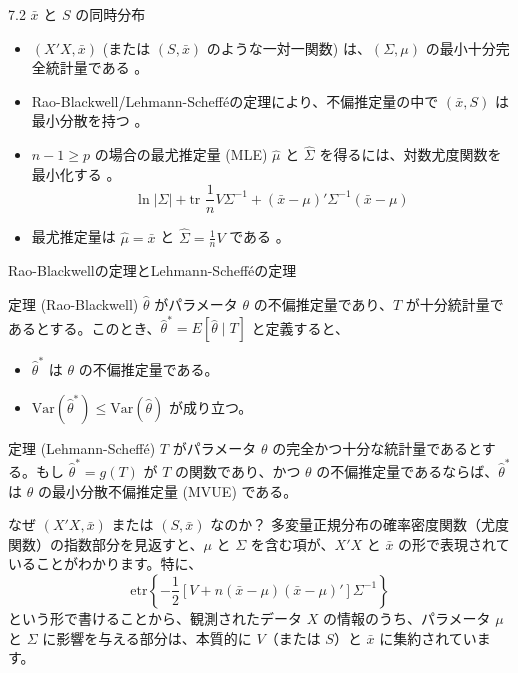 \documentclass{beamer}
\begin{document}
\begin{frame}{7.2 $\bar{x}$ と $S$ の同時分布}
\begin{itemize}
    \item $(X'X, \bar{x})$ (または $(S, \bar{x})$ のような一対一関数) は、$(\Sigma, \mu)$ の最小十分完全統計量である 。
    \item Rao-Blackwell/Lehmann-Scheff\'eの定理により、不偏推定量の中で $(\bar{x}, S)$ は最小分散を持つ 。
    \item $n-1 \ge p$ の場合の最尤推定量 (MLE) $\hat{\mu}$ と $\hat{\Sigma}$ を得るには、対数尤度関数を最小化する 。
    \begin{equation*}
    \ln |\Sigma| + \text{tr }\frac{1}{n}V\Sigma^{-1} + (\bar{x} - \mu)'\Sigma^{-1}(\bar{x} - \mu) \tag{7.2}
    \end{equation*}
    \item 最尤推定量は $\hat{\mu} = \bar{x}$ と $\hat{\Sigma} = \frac{1}{n}V$ である 。
\end{itemize}
\end{frame}

\begin{frame}{Rao-Blackwellの定理とLehmann-Schefféの定理}
\begin{block}{定理 (Rao-Blackwell)}
$\hat{\theta}$ がパラメータ $\theta$ の不偏推定量であり、$T$ が十分統計量であるとする。このとき、$\hat{\theta}^* = E[\hat{\theta} \mid T]$ と定義すると、
\begin{itemize}
    \item $\hat{\theta}^*$ は $\theta$ の不偏推定量である。
    \item $\mathrm{Var}(\hat{\theta}^*) \leq \mathrm{Var}(\hat{\theta})$ が成り立つ。
\end{itemize}
\end{block}
\begin{block}{定理 (Lehmann-Scheffé)}
$T$ がパラメータ $\theta$ の完全かつ十分な統計量であるとする。もし $\hat{\theta}^* = g(T)$ が $T$ の関数であり、かつ $\theta$ の不偏推定量であるならば、$\hat{\theta}^*$ は $\theta$ の最小分散不偏推定量 (MVUE) である。
\end{block}
\end{frame}

\begin{frame}{なぜ $(X'X, \bar{x})$ または $(S, \bar{x})$ なのか？}
多変量正規分布の確率密度関数（尤度関数）の指数部分を見返すと、$\mu$ と $\Sigma$ を含む項が、$X'X$ と $\bar{x}$ の形で表現されていることがわかります。特に、
\[
\mathrm{etr}\left\{-\frac{1}{2}\left[V + n(\bar{x} - \mu)(\bar{x} - \mu)'\right]\Sigma^{-1}\right\}
\]
という形で書けることから、観測されたデータ $X$ の情報のうち、パラメータ $\mu$ と $\Sigma$ に影響を与える部分は、本質的に $V$（または $S$）と $\bar{x}$ に集約されています。\\
\end{frame}
\end{document}
